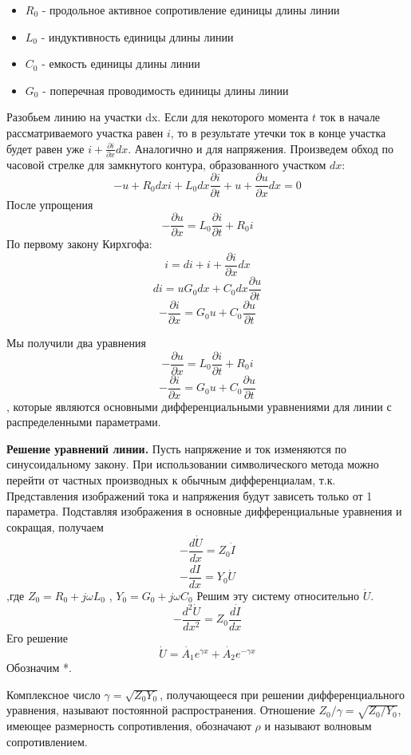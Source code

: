 \begin{itemize}
\item $R_0$ - продольное активное сопротивление единицы длины линии
\item $L_0$ - индуктивность единицы длины линии
\item $C_0$ - емкость единицы длины линии
\item $G_0$ - поперечная проводимость единицы длины линии
\end{itemize}
Разобьем линию на участки dx. Если для некоторого момента $t$ ток в начале рассматриваемого участка равен $i$, то в результате утечки ток в конце участка будет равен уже $i + \frac{\partial i}{\partial x}dx$. Аналогично и для напряжения. Произведем обход по часовой стрелке для замкнутого контура, образованного участком $dx$:
$$
-u + R_0 dxi + L_0 dx\frac{\partial i}{\partial t} + u + \frac{\partial u}{\partial x} dx = 0
$$
После упрощения
$$
-\frac{\partial u}{\partial x}= L_0 \frac{\partial i}{\partial t} + R_0 i
$$
По первому закону Кирхгофа:
$$
i = di + i + \frac{\partial i}{\partial x} dx
$$
$$
di = uG_0 dx + C_0 dx\frac{\partial u}{\partial t}
$$
$$
-\frac{\partial i}{\partial x} = G_0 u + C_0 \frac{\partial u}{\partial t}
$$

Мы получили два уравнения
$$
-\frac{\partial u}{\partial x}= L_0 \frac{\partial i}{\partial t} + R_0 i
$$
$$
-\frac{\partial i}{\partial x} = G_0 u + C_0 \frac{\partial u}{\partial t}
$$
, которые являются основными дифференциальными уравнениями для линии с распределенными параметрами.

{\bfseries Решение уравнений линии.} Пусть напряжение и ток изменяются по синусоидальному закону. При использовании символического метода можно перейти от частных производных к обычным дифференциалам, т.к. Представления изображений тока и напряжения будут зависеть только от 1 параметра. Подставляя изображения в основные дифференциальные уравнения и сокращая, получаем
$$
- \frac{d\dot{U}}{dx} = Z_0 \dot{I}
$$
$$
- \frac{d\dot{I}}{dx} = Y_0 \dot{U}
$$
,где $Z_0 = R_0 + j\omega L_0 $ , $Y_0 = G_0 + j\omega C_0$ Решим эту систему относительно $\dot{U}$.
$$
-\frac{d^2 \dot{U}}{dx^2} = Z_0 \frac{d\dot{I}}{dx}
$$
Его решение 
$$
\dot{U} = \dot{A_1}e^{\gamma x} + \dot{A_2}e^{-\gamma x}
$$ Обозначим *.

Комплексное число $\gamma = \sqrt{Z_0 Y_0}$, получающееся при решении дифференциального уравнения, называют постоянной распространения.
Отношение $Z_0 /\gamma = \sqrt{Z_0 /Y_0}$, имеющее размерность сопротивления, обозначают $\rho$ и называют волновым сопротивлением.
 
